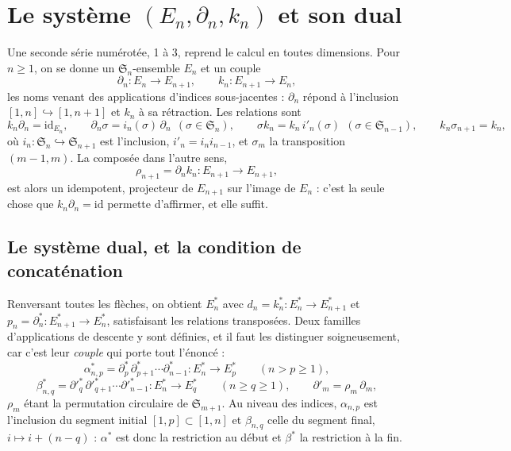 \documentclass[11pt,a4paper]{article}
\begin{document}
\section*{Le système $(E_{n}, \partial_{n}, k_{n})$ et son dual}

Une seconde série numérotée, 1 à 3, reprend le calcul en toutes dimensions.
Pour $n \geq 1$, on se donne un $\mathfrak{S}_{n}$-ensemble $E_{n}$ et un
couple
\[
  \partial_{n} \colon E_{n} \longrightarrow E_{n+1}, \qquad
  k_{n} \colon E_{n+1} \longrightarrow E_{n},
\]
les noms venant des applications d'indices sous-jacentes : $\partial_{n}$
répond à l'inclusion $[1,n] \hookrightarrow [1,n+1]$ et $k_{n}$ à sa
rétraction. Les relations sont
\[
  k_{n}\partial_{n} = \mathrm{id}_{E_{n}}, \qquad
  \partial_{n}\sigma = i_{n}(\sigma)\,\partial_{n} \ \ (\sigma \in \mathfrak{S}_{n}),
  \qquad
  \sigma k_{n} = k_{n}\,i'_{n}(\sigma) \ \ (\sigma \in \mathfrak{S}_{n-1}),
  \qquad
  k_{n}\sigma_{n+1} = k_{n},
\]
où $i_{n} \colon \mathfrak{S}_{n} \hookrightarrow \mathfrak{S}_{n+1}$ est
l'inclusion, $i'_{n} = i_{n}i_{n-1}$, et $\sigma_{m}$ la transposition
$(m-1,m)$. La composée dans l'autre sens,
\[
  \rho_{n+1} = \partial_{n}k_{n} \colon E_{n+1} \longrightarrow E_{n+1},
\]
est alors un idempotent, projecteur de $E_{n+1}$ sur l'image de $E_{n}$ : c'est
la seule chose que $k_{n}\partial_{n} = \mathrm{id}$ permette d'affirmer, et
elle suffit.

\subsection*{Le système dual, et la condition de concaténation}

Renversant toutes les flèches, on obtient $E^{*}_{n}$ avec
$d_{n} = k^{*}_{n} \colon E^{*}_{n} \to E^{*}_{n+1}$ et
$p_{n} = \partial^{*}_{n} \colon E^{*}_{n+1} \to E^{*}_{n}$, satisfaisant les
relations transposées. Deux familles d'applications de descente y sont
définies, et il faut les distinguer soigneusement, car c'est leur \emph{couple}
qui porte tout l'énoncé :
\[
  \alpha^{*}_{n,p} = \partial^{*}_{p}\,\partial^{*}_{p+1}\cdots\partial^{*}_{n-1}
  \colon E^{*}_{n} \longrightarrow E^{*}_{p} \qquad (n > p \geq 1),
\]
\[
  \beta^{*}_{n,q} = \partial'^{*}_{q}\,\partial'^{*}_{q+1}\cdots\partial'^{*}_{n-1}
  \colon E^{*}_{n} \longrightarrow E^{*}_{q} \qquad (n \geq q \geq 1),
  \qquad \partial'_{m} = \rho_{m}\,\partial_{m},
\]
$\rho_{m}$ étant la permutation circulaire de $\mathfrak{S}_{m+1}$. Au niveau
des indices, $\alpha_{n,p}$ est l'inclusion du segment initial
$[1,p] \subset [1,n]$ et $\beta_{n,q}$ celle du segment final, $i \mapsto
i + (n-q)$ : $\alpha^{*}$ est donc la restriction au début et $\beta^{*}$ la
restriction à la fin.
\end{document}
